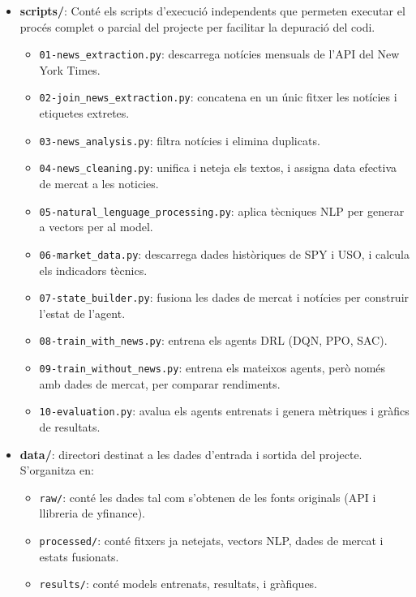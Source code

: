 \documentclass[12pt,a4paper,twoside]{book}
\begin{document}
\begin{itemize}
    \item \textbf{scripts/}: Conté els scripts d'execució independents que permeten executar el procés complet o parcial del projecte per facilitar la depuració del codi.
    \begin{itemize}
        \item \texttt{01-news\_extraction.py}: descarrega notícies mensuals de l'API del New York Times.
        \item \texttt{02-join\_news\_extraction.py}: concatena en un únic fitxer les notícies i etiquetes extretes.
        \item \texttt{03-news\_analysis.py}: filtra notícies i elimina duplicats.
        \item \texttt{04-news\_cleaning.py}: unifica i neteja els textos, i assigna data efectiva de mercat a les noticies.
        \item \texttt{05-natural\_lenguage\_processing.py}: aplica tècniques NLP per generar a vectors per al model.
        \item \texttt{06-market\_data.py}: descarrega dades històriques de SPY i USO, i calcula els indicadors tècnics.
        \item \texttt{07-state\_builder.py}: fusiona les dades de mercat i notícies per construir l'estat de l'agent.
        \item \texttt{08-train\_with\_news.py}: entrena els agents DRL (DQN, PPO, SAC).
        \item \texttt{09-train\_without\_news.py}: entrena els mateixos agents, però només amb dades de mercat, per comparar rendiments.
        \item \texttt{10-evaluation.py}: avalua els agents entrenats i genera mètriques i gràfics de resultats.
    \end{itemize}

    \item \textbf{data/}: directori destinat a les dades d'entrada i sortida del projecte. S'organitza en:
    \begin{itemize}
        \item \texttt{raw/}: conté les dades tal com s'obtenen de les fonts originals (API i llibreria de yfinance).
        \item \texttt{processed/}: conté fitxers ja netejats, vectors NLP, dades de mercat i estats fusionats.
        \item \texttt{results/}: conté models entrenats, resultats, i gràfiques.
    \end{itemize}


\end{itemize}
\end{document}
